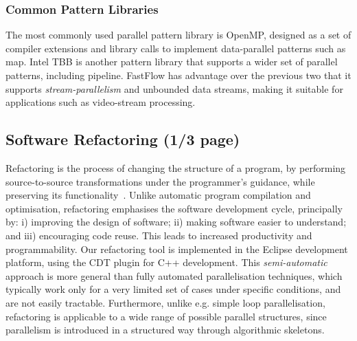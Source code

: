 \documentclass[runningheads]{llncs}
\begin{document}
\subsubsection{Common Pattern Libraries}
The most commonly used parallel pattern library is OpenMP\cite{Chapman:2007:UOP:1370966}, designed as a set of compiler extensions and library calls to implement data-parallel patterns
such as map. Intel TBB\cite{Reinders:2007:ITB:1461409} is another pattern library that supports a wider set of parallel patterns, including pipeline.
FastFlow\cite{DBLP:conf/europar/AldinucciDKMT11} has advantage over the previous two that it supports \emph{stream-parallelism} and unbounded data streams, making it suitable for
applications such as video-stream processing.


\subsection{Software Refactoring (1/3 page)}
Refactoring is the process of changing the structure of a program,
by performing source-to-source transformations under the programmer's guidance,
while preserving its functionality~\cite{opdyke}.  Unlike automatic
program compilation and optimisation, refactoring emphasises the
software development cycle, principally by: i) improving the design of
software; ii) making software easier to understand; and iii)
encouraging code reuse. This leads to increased productivity and
programmability. Our refactoring tool is
implemented in the Eclipse development platform, using the CDT plugin
for C++ development.
This \emph{semi-automatic} approach is more general than fully
automated parallelisation techniques, which typically work only for a
very limited set of cases under specific conditions, and are not
easily tractable.
Furthermore, unlike e.g. simple loop parallelisation, 
refactoring is applicable to a wide range of possible parallel structures,
since parallelism is introduced in a structured way through algorithmic skeletons. 
\end{document}
